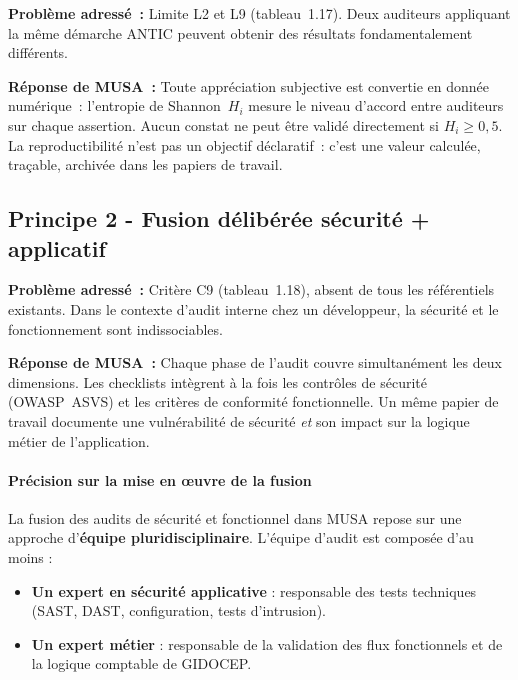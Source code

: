 \documentclass[12pt,a4paper,oneside]{report}
\begin{document}
\textbf{Probl\`eme adress\'e~:} Limite L2 et L9 (tableau~1.17). Deux auditeurs
appliquant la m\^eme d\'emarche ANTIC peuvent obtenir des r\'esultats
fondamentalement diff\'erents.

\textbf{R\'eponse de MUSA~:} Toute appr\'eciation subjective est convertie en
donn\'ee num\'erique~: l'entropie de Shannon~$H_i$ mesure le niveau d'accord
entre auditeurs sur chaque assertion. Aucun constat ne peut \^etre valid\'e
directement si $H_i \geq 0{,}5$. La reproductibilit\'e n'est pas un objectif
d\'eclaratif~: c'est une valeur calcul\'ee, traçable, archiv\'ee dans les papiers
de travail.

\subsection{Principe 2 - Fusion d\'elib\'er\'ee s\'ecurit\'e + applicatif}

\textbf{Probl\`eme adress\'e~:} Crit\`ere C9 (tableau~1.18), absent de tous les
r\'ef\'erentiels existants. Dans le contexte d'audit interne chez un d\'eveloppeur,
la s\'ecurit\'e et le fonctionnement sont indissociables.

\textbf{R\'eponse de MUSA~:} Chaque phase de l'audit couvre simultan\'ement les
deux dimensions. Les checklists int\`egrent \`a la fois les contrôles de s\'ecurit\'e
(OWASP~ASVS) et les crit\`eres de conformit\'e fonctionnelle. Un m\^eme papier de
travail documente une vuln\'erabilit\'e de s\'ecurit\'e \textit{et} son impact sur
la logique m\'etier de l'application.

\paragraph{Précision sur la mise en œuvre de la fusion}

La fusion des audits de sécurité et fonctionnel dans MUSA repose sur 
une approche d'\textbf{équipe pluridisciplinaire}. L'équipe d'audit 
est composée d'au moins :

\begin{itemize}[label={\color{gold}}, leftmargin=*]
	\item \textbf{Un expert en sécurité applicative} : responsable des 
	tests techniques (SAST, DAST, configuration, tests d'intrusion).
	\item \textbf{Un expert métier} : responsable de la validation des 
	flux fonctionnels et de la logique comptable de GIDOCEP.
\end{itemize}
\end{document}
